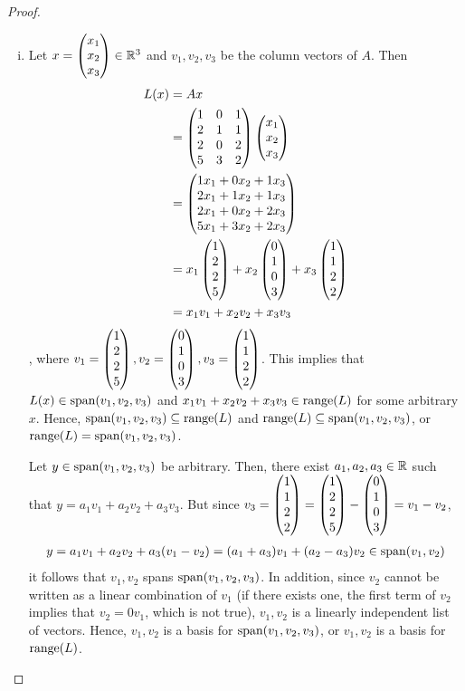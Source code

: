 \begin{proof}
    \renewcommand{\qedsymbol}{$\blacksquare$}
    \begin{enumerate}[(i)]
    \item 
        Let $x=\begin{pmatrix} x_1\\ x_2\\ x_3\end{pmatrix}\in\mathbb R^3$ and $v_1,v_2,v_3$ be the column vectors of $A$. Then 
        \[
            \begin{aligned}
                L(x) &= Ax\\
                &= \begin{pmatrix}
                    1 & 0 & 1 \\
                    2 & 1 & 1 \\
                    2 & 0 & 2 \\
                    5 & 3 & 2 
                   \end{pmatrix}\begin{pmatrix} x_1\\ x_2\\ x_3\end{pmatrix}\\
                &= \begin{pmatrix} 1x_1+0x_2+1x_3\\ 2x_1+1x_2+1x_3\\2x_1+0x_2+2x_3 \\ 5x_1+3x_2+2x_3\end{pmatrix}\\
                &= x_1 \begin{pmatrix} 1\\ 2\\2 \\ 5\end{pmatrix}+x_2 \begin{pmatrix} 0\\ 1\\0 \\ 3\end{pmatrix}+ x_3 \begin{pmatrix} 1\\ 1\\2 \\ 2\end{pmatrix}\\
                &= x_1v_1+x_2v_2+x_3v_3
            \end{aligned}
        \]
        , where $v_1=\begin{pmatrix} 1\\ 2\\2 \\ 5\end{pmatrix},v_2=\begin{pmatrix} 0\\ 1\\0 \\ 3\end{pmatrix},v_3=\begin{pmatrix} 1\\ 1\\2 \\ 2\end{pmatrix}$.
        This implies that $L(x)\in\textnormal{span}(v_1,v_2,v_3)$ and $x_1v_1+x_2v_2+x_3v_3\in\textnormal{range}(L)$ for some arbitrary $x$. Hence, $\textnormal{span}(v_1,v_2,v_3)\subseteq\textnormal{range}(L)$ and $\textnormal{range}(L)\subseteq\textnormal{span}(v_1,v_2,v_3)$, or $\textnormal{range}(L)=\textnormal{span}(v_1,v_2,v_3)$.
        
        Let $y\in\textnormal{span}(v_1,v_2,v_3)$ be arbitrary.
        Then, there exist $a_1,a_2,a_3\in\mathbb R$ such that $y=a_1v_1+a_2v_2+a_3v_3$.
        But since $v_3=\begin{pmatrix} 1\\ 1\\2 \\ 2\end{pmatrix}=\begin{pmatrix} 1\\ 2\\2 \\ 5\end{pmatrix}-\begin{pmatrix} 0\\ 1\\0 \\ 3\end{pmatrix}=v_1-v_2$,
        \[
            \begin{aligned}
                y=a_1v_1+a_2v_2+a_3(v_1-v_2)=(a_1+a_3)v_1+(a_2-a_3)v_2\in\textnormal{span}(v_1,v_2)
            \end{aligned}
        \]
        it follows that $v_1,v_2$ spans $\textnormal{span}(v_1,v_2,v_3)$.
        In addition, since $v_2$ cannot be written as a linear combination of $v_1$ (if there exists one, the first term of $v_2$ implies that $v_2=0v_1$, which is not true), $v_1,v_2$ is a linearly independent list of vectors.
        Hence, $v_1,v_2$ is a basis for $\textnormal{span}(v_1,v_2,v_3)$, or $v_1,v_2$ is a basis for $\textnormal{range}(L)$.


\end{enumerate}
\end{proof}
